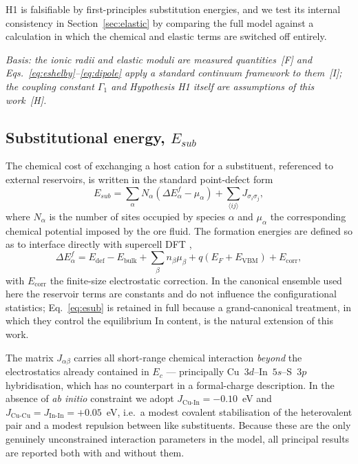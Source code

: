 \documentclass[11pt,a4paper]{article}
\begin{document}
H1 is falsifiable by first-principles substitution energies, and we test its
internal consistency in Section~\ref{sec:elastic} by comparing the full model
against a calculation in which the chemical and elastic terms are switched off
entirely.

\textit{Basis: the ionic radii and elastic moduli are measured quantities~[F]
and Eqs.~\eqref{eq:eshelby}--\eqref{eq:dipole} apply a standard continuum
framework to them~[I]; the coupling constant $\Gamma_1$ and Hypothesis H1 itself
are assumptions of this work~[H].}

\subsection{Substitutional energy, \texorpdfstring{$E_{sub}$}{Esub}}
\label{sec:esub}

The chemical cost of exchanging a host cation for a substituent, referenced to
external reservoirs, is written in the standard point-defect form
\begin{equation}
E_{sub} = \sum_\alpha N_\alpha \left( \Delta E^{f}_{\alpha} - \mu_\alpha \right)
 + \sum_{\langle ij \rangle} J_{\sigma_i \sigma_j},
\label{eq:esub}
\end{equation}
where $N_\alpha$ is the number of sites occupied by species $\alpha$ and
$\mu_\alpha$ the corresponding chemical potential imposed by the ore fluid. The
formation energies are defined so as to interface directly with supercell DFT
\citep{freysoldt2014},
\begin{equation}
\Delta E^{f}_{\alpha} = E_{\mathrm{def}} - E_{\mathrm{bulk}}
+ \sum_\beta n_\beta \mu_\beta + q\left( E_F + E_{\mathrm{VBM}} \right) + E_{\mathrm{corr}},
\label{eq:dft}
\end{equation}
with $E_{\mathrm{corr}}$ the finite-size electrostatic correction. In the
canonical ensemble used here the reservoir terms are constants and do not
influence the configurational statistics; Eq.~\eqref{eq:esub} is retained in
full because a grand-canonical treatment, in which they control the equilibrium
In content, is the natural extension of this work.

The matrix $J_{\alpha\beta}$ carries all short-range chemical interaction
\emph{beyond} the electrostatics already contained in $E_c$ --- principally
Cu~$3d$--In~$5s$--S~$3p$ hybridisation, which has no counterpart in a
formal-charge description. In the absence of \textit{ab initio} constraint we
adopt $J_{\mathrm{Cu\text{-}In}} = -0.10$~eV and
$J_{\mathrm{Cu\text{-}Cu}} = J_{\mathrm{In\text{-}In}} = +0.05$~eV, i.e.\ a
modest covalent stabilisation of the heterovalent pair and a modest repulsion
between like substituents. Because these are the only genuinely unconstrained
interaction parameters in the model, all principal results are reported both
with and without them.
\end{document}
